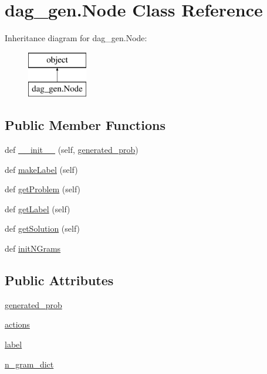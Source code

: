 \hypertarget{classdag__gen_1_1_node}{}\section{dag\+\_\+gen.\+Node Class Reference}
\label{classdag__gen_1_1_node}
Inheritance diagram for dag\+\_\+gen.\+Node\+:\begin{figure}[H]
\begin{center}
\leavevmode
\includegraphics[height=2.000000cm]{classdag__gen_1_1_node}
\end{center}
\end{figure}
\subsection*{Public Member Functions}
\begin{DoxyCompactItemize}
\item 
def \hyperlink{classdag__gen_1_1_node_afae5cc7b8cc77626e64337c794cb486a}{\+\_\+\+\_\+init\+\_\+\+\_\+} (self, \hyperlink{classdag__gen_1_1_node_ae5160425be45f6f6a5f845d5228c8bc4}{generated\+\_\+prob})
\item 
def \hyperlink{classdag__gen_1_1_node_a29bf8915d1731d0a878e6644e13f5393}{make\+Label} (self)
\item 
def \hyperlink{classdag__gen_1_1_node_ad2cdb31d1eacc93ddab884956cd4a79a}{get\+Problem} (self)
\item 
def \hyperlink{classdag__gen_1_1_node_aea85c8afa8aa74d2a8ae6fea0c615739}{get\+Label} (self)
\item 
def \hyperlink{classdag__gen_1_1_node_a1612ad2307bd62f1ca6da3311ef73e55}{get\+Solution} (self)
\item 
def \hyperlink{classdag__gen_1_1_node_a01d07d40bcaf46db75ab5ec5b42d3b71}{init\+N\+Grams}
\end{DoxyCompactItemize}
\subsection*{Public Attributes}
\begin{DoxyCompactItemize}
\item 
\hyperlink{classdag__gen_1_1_node_ae5160425be45f6f6a5f845d5228c8bc4}{generated\+\_\+prob}
\item 
\hyperlink{classdag__gen_1_1_node_ad4b54905b8ac4c8d1ddbcbab7c2a6423}{actions}
\item 
\hyperlink{classdag__gen_1_1_node_a7288dbd5b48a2c69dcd9415c1566d3fe}{label}
\item 
\hyperlink{classdag__gen_1_1_node_ac9cef37d91d2466e146fcc75639a898d}{n\+\_\+gram\+\_\+dict}
\end{DoxyCompactItemize}


